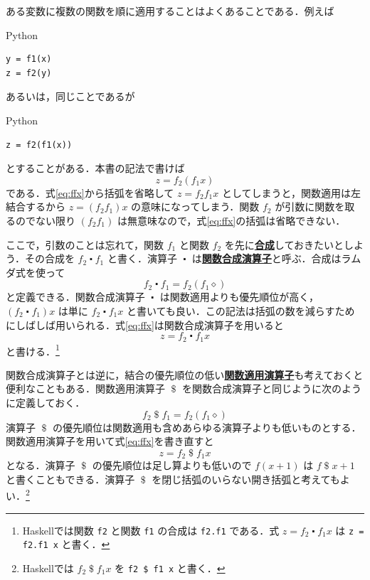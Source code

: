 \documentclass[a4paper,twocolumn]{jsbook}
\newcommand{\programminglanguage}[1]{\textsf{#1}}
\newcommand{\haskell}{\programminglanguage{Haskell}}
\newcommand{\python}{\programminglanguage{Python}}
\newcommand{\keyword}[1]{{\underline{\textbf{#1}}}}
\newcommand{\code}[1]{\texttt{#1}}
\newenvironment{pythoncode}{\begin{itembox}[r]{\python}}{\end{itembox}}
\newcommand{\mAnonParam}{\diamond}
\DeclareMathOperator{\mApply}{\$}
\DeclareMathOperator{\mComp}{\centerdot}
\begin{document}
ある変数に複数の関数を順に適用することはよくあることである．例えば
\begin{pythoncode}
\begin{verbatim}
y = f1(x)
z = f2(y)
\end{verbatim}
\end{pythoncode}
あるいは，同じことであるが
\begin{pythoncode}
\begin{verbatim}
z = f2(f1(x))
\end{verbatim}
\end{pythoncode}
とすることがある．本書の記法で書けば
\begin{equation}
\label{eq:ffx}
z=f_2(f_1x)
\end{equation}
である．式\eqref{eq:ffx}から括弧を省略して $z=f_2f_1x$ としてしまうと，関数適用は左結合するから $z=(f_2f_1)x$ の意味になってしまう．関数 $f_2$ が引数に関数を取るのでない限り $(f_2f_1)$ は無意味なので，式\eqref{eq:ffx}の括弧は省略できない．

ここで，引数のことは忘れて，関数 $f_1$ と関数 $f_2$ を先に\keyword{合成}しておきたいとしよう．その合成を $f_2\mComp f_1$ と書く．演算子 $\mComp$ は\keyword{関数合成演算子}と呼ぶ．合成はラムダ式を使って
\begin{equation}
f_2\mComp f_1=f_2(f_1\mAnonParam)
\end{equation}
と定義できる．関数合成演算子 $\mComp$ は関数適用よりも優先順位が高く，$\left(f_2\mComp f_1\right)x$ は単に $f_2\mComp f_1x$ と書いても良い．この記法は括弧の数を減らすためにしばしば用いられる．式\eqref{eq:ffx}は関数合成演算子を用いると
\begin{equation}
z=f_2\mComp f_1x
\end{equation}
と書ける．\footnote{\haskell では関数 \code{f2} と関数 \code{f1} の合成は \code{f2.f1} である．式 $z=f_2\mComp f_1x$ は \code{z = f2.f1 x} と書く．}

関数合成演算子とは逆に，結合の優先順位の低い\keyword{関数適用演算子}も考えておくと便利なこともある．関数適用演算子 $\mApply$ を関数合成演算子と同じように次のように定義しておく．
\begin{equation}
f_2\mApply f_1=f_2\left(f_1\mAnonParam\right)
\end{equation}
演算子 $\mApply$ の優先順位は関数適用も含めあらゆる演算子よりも低いものとする．関数適用演算子を用いて式\eqref{eq:ffx}を書き直すと
\begin{equation}
z=f_2\mApply f_1x
\end{equation}
となる．演算子 $\mApply$ の優先順位は足し算よりも低いので $f(x+1)$ は $f\mApply x+1$ と書くこともできる．演算子 $\mApply$ を閉じ括弧のいらない開き括弧と考えてもよい．\footnote{\haskell では $f_2\mApply f_1x$ を \code{f2 \$ f1 x} と書く．}
\end{document}
